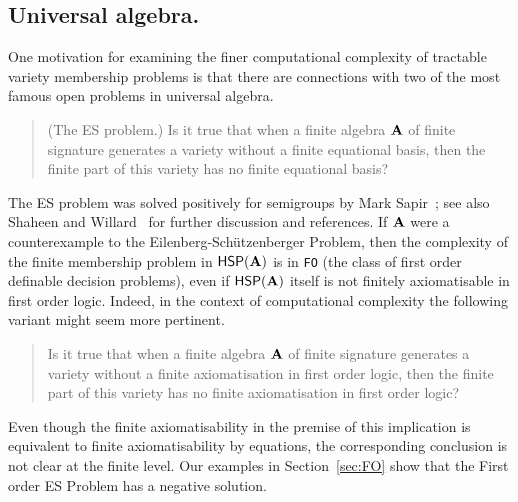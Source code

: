 \documentclass[reqno]{amsart}
\theoremstyle{plain}
\theoremstyle{definition}
\begin{document}
\subsection{Universal algebra.}
One motivation for examining the finer computational complexity of tractable variety membership problems is that there are connections with two of the most famous open problems in universal algebra.  
\begin{quotation}
  (The ES problem.) Is it true that when a finite algebra ${\bf A}$ of finite signature generates a variety without a finite equational basis, then the finite part of this variety has no finite equational basis?
\end{quotation}
The ES problem was solved positively for semigroups by Mark Sapir~\cite{sap}; see also Shaheen and Willard~\cite{shawil} for further discussion and references.
If ${\bf A}$ were a counterexample  to the  Eilenberg-Sch\"utzenberger Problem, then the complexity of the finite membership problem in $\mathsf{HSP}({\bf A})$ is in \texttt{FO} (the class of first order definable decision problems), even if $\mathsf{HSP}({\bf A})$ itself is not finitely axiomatisable in first order logic.  Indeed, in the context of computational complexity the following variant might seem more pertinent.
\begin{quotation}
  Is it true that when a finite algebra ${\bf A}$ of finite signature generates a variety without a finite axiomatisation in first order logic, then the finite part of this variety has no finite axiomatisation in first order logic? 
\end{quotation}
Even though the finite axiomatisability in the premise of this implication is equivalent to finite axiomatisability by equations, the corresponding conclusion is not clear at the finite level.  
Our examples in Section~\ref{sec:FO} show that the First order ES Problem has a negative solution.  
\end{document}
